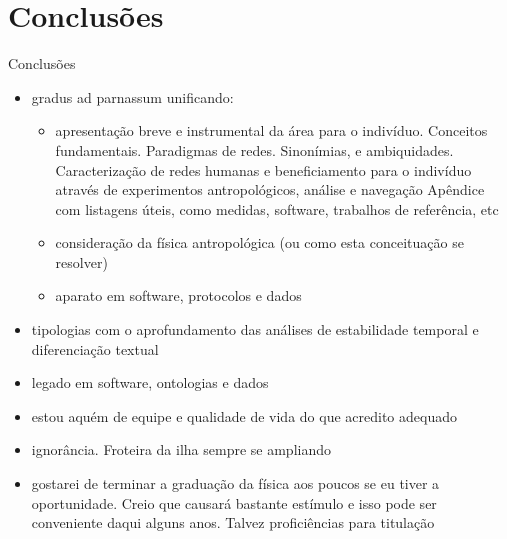 \documentclass[10pt]{beamer}
\begin{document}
\section{Conclusões}
\begin{frame}{Conclusões}
\begin{itemize}
	\item gradus ad parnassum unificando:
		\begin{itemize}
			\item  apresentação breve e instrumental da área para o indivíduo. Conceitos fundamentais. Paradigmas de redes. Sinonímias, e ambiquidades. Caracterização de redes humanas e beneficiamento para o indivíduo através de experimentos antropológicos, análise e navegação
				Apêndice com listagens úteis, como medidas, software, trabalhos de referência, etc
			\item consideração da física antropológica (ou como esta conceituação se resolver)
			\item aparato em software, protocolos e dados
		\end{itemize}
	\item tipologias com o aprofundamento das análises de estabilidade temporal e diferenciação textual
	\item legado em software, ontologias e dados
	\item estou aquém de equipe e qualidade de vida do que acredito adequado
	\item ignorância. Froteira da ilha sempre se ampliando
	\item gostarei de terminar a graduação da física aos poucos se eu tiver a oportunidade. Creio que causará bastante estímulo e isso pode ser conveniente daqui alguns anos. Talvez proficiências para titulação
\end{itemize}
\end{frame}
\end{document}
